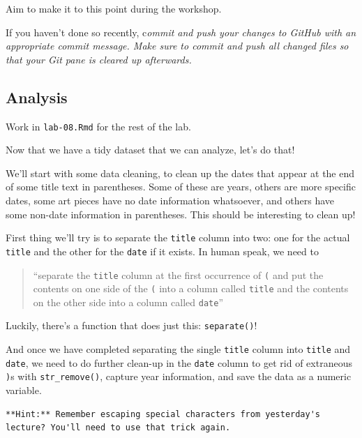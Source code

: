 \documentclass[
]{article}
\begin{document}
Aim to make it to this point during the workshop.

If you haven't done so recently, c\emph{ommit and push your changes to
GitHub with an appropriate commit message. Make sure to commit and push
all changed files so that your Git pane is cleared up afterwards.}

\subsection{Analysis}\label{analysis}

Work in \texttt{lab-08.Rmd} for the rest of the lab.

Now that we have a tidy dataset that we can analyze, let's do that!

We'll start with some data cleaning, to clean up the dates that appear
at the end of some title text in parentheses. Some of these are years,
others are more specific dates, some art pieces have no date information
whatsoever, and others have some non-date information in parentheses.
This should be interesting to clean up!

First thing we'll try is to separate the \texttt{title} column into two:
one for the actual \texttt{title} and the other for the \texttt{date} if
it exists. In human speak, we need to

\begin{quote}
``separate the \texttt{title} column at the first occurrence of
\texttt{(} and put the contents on one side of the \texttt{(} into a
column called \texttt{title} and the contents on the other side into a
column called \texttt{date}''
\end{quote}

Luckily, there's a function that does just this: \texttt{separate()}!

And once we have completed separating the single \texttt{title} column
into \texttt{title} and \texttt{date}, we need to do further clean-up in
the \texttt{date} column to get rid of extraneous \texttt{)}s with
\texttt{str\_remove()}, capture year information, and save the data as a
numeric variable.

\begin{verbatim}
**Hint:** Remember escaping special characters from yesterday's lecture? You'll need to use that trick again.
\end{verbatim}
\end{document}
